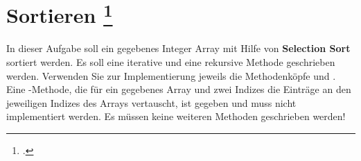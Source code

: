 \documentclass{lehramt-informatik-aufgabe}
\begin{document}

\section{Sortieren
\footcite[Aufgabe 2]{aud:e-klausur}}

In dieser Aufgabe soll ein gegebenes Integer Array mit Hilfe von
\textbf{Selection Sort} sortiert werden. Es soll eine
iterative und eine
rekursive Methode geschrieben werden.
%
Verwenden Sie zur Implementierung jeweils die Methodenköpfe
 und
. Eine -Methode,
die für ein gegebenes Array und zwei Indizes die Einträge an den
jeweiligen Indizes des Arrays vertauscht, ist gegeben und muss nicht
implementiert werden.
%
Es müssen keine weiteren Methoden geschrieben werden!

\begin{liAntwort}



\end{liAntwort}
\end{document}
